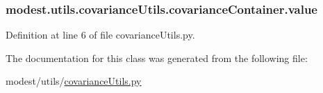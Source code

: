 \subsubsection[{\texorpdfstring{value}{value}}]{\setlength{\rightskip}{0pt plus 5cm}modest.\+utils.\+covariance\+Utils.\+covariance\+Container.\+value}\hypertarget{classmodest_1_1utils_1_1covarianceUtils_1_1covarianceContainer_abe099ec2109ec206be8f327a13bf700b}{}\label{classmodest_1_1utils_1_1covarianceUtils_1_1covarianceContainer_abe099ec2109ec206be8f327a13bf700b}


Definition at line 6 of file covariance\+Utils.\+py.



The documentation for this class was generated from the following file\+:\begin{DoxyCompactItemize}
\item 
modest/utils/\hyperlink{covarianceUtils_8py}{covariance\+Utils.\+py}\end{DoxyCompactItemize}
